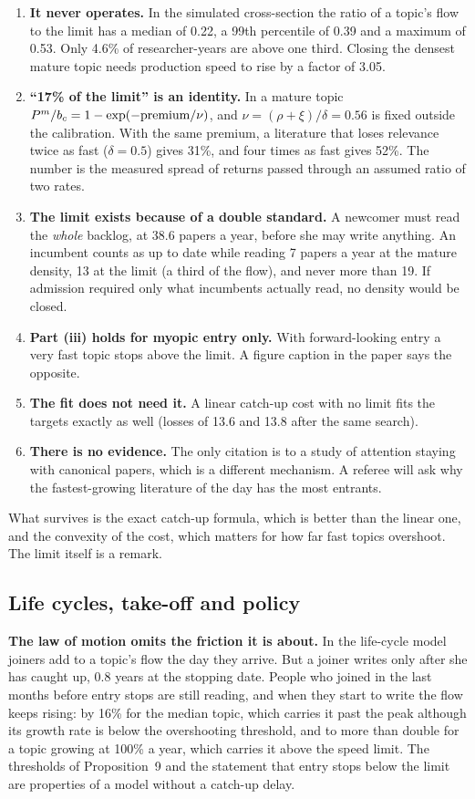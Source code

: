 \begin{enumerate}
\item \textbf{It never operates.} In the simulated cross-section the ratio of a topic's flow to the limit has a median of 0.22, a 99th percentile of 0.39 and a maximum of 0.53. Only 4.6\% of researcher-years are above one third. Closing the densest mature topic needs production speed to rise by a factor of 3.05.
\item \textbf{``17\% of the limit'' is an identity.} In a mature topic $P^{m}/b_c=1-\exp(-\text{premium}/\nu)$, and $\nu=(\rho+\xi)/\delta=0.56$ is fixed outside the calibration. With the same premium, a literature that loses relevance twice as fast ($\delta=0.5$) gives 31\%, and four times as fast gives 52\%. The number is the measured spread of returns passed through an assumed ratio of two rates.
\item \textbf{The limit exists because of a double standard.} A newcomer must read the \emph{whole} backlog, at 38.6 papers a year, before she may write anything. An incumbent counts as up to date while reading 7 papers a year at the mature density, 13 at the limit (a third of the flow), and never more than 19. If admission required only what incumbents actually read, no density would be closed.
\item \textbf{Part (iii) holds for myopic entry only.} With forward-looking entry a very fast topic stops above the limit. A figure caption in the paper says the opposite.
\item \textbf{The fit does not need it.} A linear catch-up cost with no limit fits the targets exactly as well (losses of 13.6 and 13.8 after the same search).
\item \textbf{There is no evidence.} The only citation is to a study of attention staying with canonical papers, which is a different mechanism. A referee will ask why the fastest-growing literature of the day has the most entrants.
\end{enumerate}

What survives is the exact catch-up formula, which is better than the linear one, and the convexity of the cost, which matters for how far fast topics overshoot. The limit itself is a remark.

\subsection{Life cycles, take-off and policy}\label{sec:crit-dynamics}

\textbf{The law of motion omits the friction it is about.} In the life-cycle model joiners add to a topic's flow the day they arrive. But a joiner writes only after she has caught up, 0.8 years at the stopping date. People who joined in the last months before entry stops are still reading, and when they start to write the flow keeps rising: by 16\% for the median topic, which carries it past the peak although its growth rate is below the overshooting threshold, and to more than double for a topic growing at 100\% a year, which carries it above the speed limit. The thresholds of Proposition~9 and the statement that entry stops below the limit are properties of a model without a catch-up delay.

